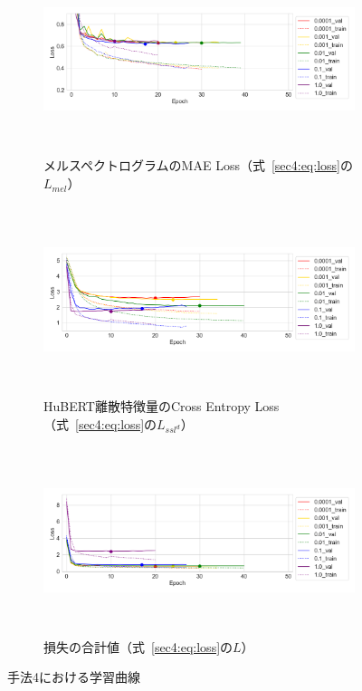 \documentclass[12pt]{jarticle}
\numberwithin{equation}{section}    %
\numberwithin{figure}{section}      %
\numberwithin{table}{section}      %
\begin{document}
\begin{figure}[bt]
    \centering
    \begin{subfigure}{\linewidth}
        \centering
        \includegraphics[height=55mm]{./figure/sec4/learning_curve/impact_of_loss_weights_across_methods/4/mel_loss.png}
        \caption{メルスペクトログラムのMAE Loss（式~\eqref{sec4:eq:loss}の$L_{mel}$）}
        \label{sec4:fig:learning_curve_method_4_val_mel_loss}
    \end{subfigure}
    \begin{subfigure}{\linewidth}
        \centering
        \includegraphics[height=55mm]{./figure/sec4/learning_curve/impact_of_loss_weights_across_methods/4/ssl_feature_cluster_loss.png}
        \caption{HuBERT離散特徴量のCross Entropy Loss（式~\eqref{sec4:eq:loss}の$L_{ssl^{d}}$）}
        \label{sec4:fig:learning_curve_method_4_val_ssl_feature_cluster_loss}
    \end{subfigure}
    \begin{subfigure}{\linewidth}
        \centering
        \includegraphics[height=55mm]{./figure/sec4/learning_curve/impact_of_loss_weights_across_methods/4/total_loss.png}
        \caption{損失の合計値（式~\eqref{sec4:eq:loss}の$L$）}
        \label{sec4:fig:learning_curve_method_4_val_total_loss}
    \end{subfigure}
    \caption{手法4における学習曲線}
    \label{sec4:fig:learning_curve_method_4_val_losses}
\end{figure}
\end{document}
